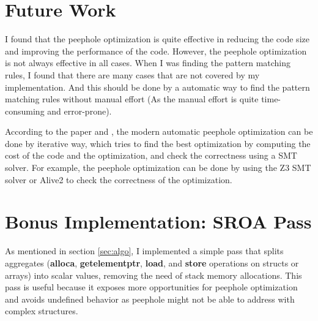 \documentclass[conference]{IEEEtran}
\begin{document}
\section{Future Work}
I found that the peephole optimization is quite effective in reducing the code size and improving the performance of the code. However, the peephole optimization is not always effective in all cases. When I was finding the pattern matching rules, I found that there are many cases that are not covered by my implementation. And this should be done by a automatic way to find the pattern matching rules without manual effort (As the manual effort is quite time-consuming and error-prone).

According to the paper \cite{b1} and \cite{b2}, the modern automatic peephole optimization can be done by iterative way, which tries to find the best optimization by computing the cost of the code and the optimization, and check the correctness using a SMT solver. For example, the peephole optimization can be done by using the Z3 SMT solver or Alive2 to check the correctness of the optimization.

\section{Bonus Implementation: SROA Pass}
\label{sec:bonus}
As mentioned in section \ref{sec:algo}, I implemented a simple pass that splits aggregates (\textbf{alloca}, \textbf{getelementptr}, \textbf{load}, and \textbf{store} operations on structs or arrays) into scalar values, removing the need of stack memory allocations. This pass is useful because it exposes more opportunities for peephole optimization and avoids undefined behavior as peephole might not be able to address with complex structures.
\end{document}
